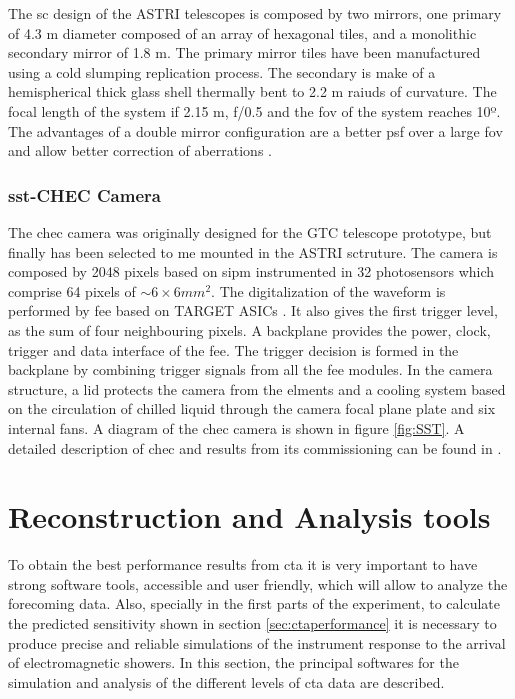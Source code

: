 \documentclass[main.tex]{subfiles}
\begin{document}
The \gls{sc} design of the ASTRI telescopes is composed by two mirrors, one primary of 4.3 m diameter composed of an array of hexagonal tiles, and a monolithic secondary mirror of 1.8 m. The primary mirror tiles have been manufactured using a cold slumping replication process. The secondary is make of a hemispherical thick glass shell thermally bent to 2.2 m raiuds of curvature. The focal length of the system if 2.15 m, f/0.5 and the \gls{fov} of the system reaches 10º.\\
The advantages of a double mirror configuration are a better \gls{psf} over a large \gls{fov} and allow better correction of aberrations \cite{2017ASTRItels}.

\subsubsection{\gls{sst}-CHEC Camera}

The \gls{chec} camera was originally designed for the GTC telescope prototype, but finally has been selected to me mounted in the ASTRI sctruture. The camera is composed by 2048 pixels based on \gls{sipm} instrumented in 32 photosensors which comprise 64 pixels of $\sim 6\times6 mm^2$. The digitalization of the waveform is performed by \gls{fee} based on TARGET ASICs \cite{2017TARGETASIC}. It also gives the first trigger level, as the sum of four neighbouring pixels. A backplane provides the power, clock, trigger and data interface of the \gls{fee}. The trigger decision is formed in the backplane by combining trigger signals from all the \gls{fee} modules. In the camera structure, a lid protects the camera from the elments and a cooling system based on the circulation of chilled liquid through the camera focal plane plate and six internal fans. A diagram of the \gls{chec} camera is shown in figure \ref{fig:SST}. A detailed description of \gls{chec} and results from its commissioning can be found in \cite{2017CHECcam}.

\section{Reconstruction and Analysis tools} \label{sec:ctaanalysis}

To obtain the best performance results from \gls{cta} it is very important to have strong software tools, accessible and user friendly, which will allow to analyze the forecoming data. Also, specially in the first parts of the experiment, to calculate the predicted sensitivity shown in section \ref{sec:ctaperformance} it is necessary to produce precise and reliable simulations of the instrument response to the arrival of electromagnetic showers. In this section, the principal softwares for the simulation and analysis of the different levels of \gls{cta} data are described. 
\end{document}
